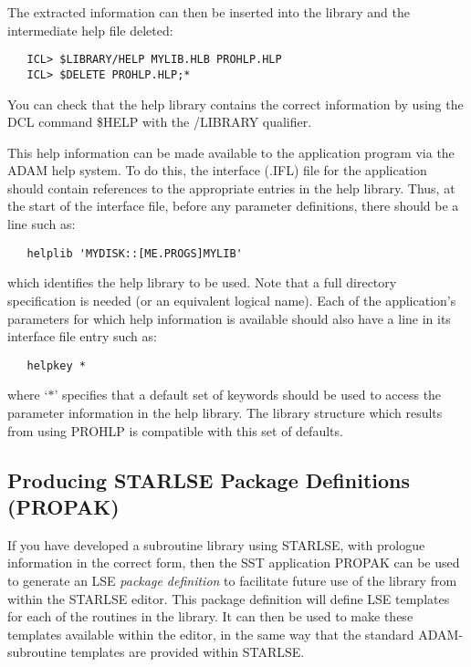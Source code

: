 The extracted information can then be inserted into the library and the
intermediate help file deleted:

\begin{verbatim}
   ICL> $LIBRARY/HELP MYLIB.HLB PROHLP.HLP
   ICL> $DELETE PROHLP.HLP;*
\end{verbatim}

You can check that the help library contains the correct information by using
the DCL command \$HELP with the /LIBRARY qualifier.

This help information can be made available to the application program via
the ADAM help system.
To do this, the interface (.IFL) file for the application should contain
references to the appropriate entries in the help library.
Thus, at the start of the interface file, before any parameter definitions,
there should be a line such as:

\begin{verbatim}
   helplib 'MYDISK::[ME.PROGS]MYLIB'
\end{verbatim}

which identifies the help library to be used.
Note that a full directory specification is needed (or an equivalent logical
name).
Each of the application's parameters for which help information is available
should also have a line in its interface file entry such as:

\begin{verbatim}
   helpkey *
\end{verbatim}

where `$*$' specifies that a default set of keywords should be used to
access the parameter information in the help library.
The library structure which results from using PROHLP is compatible with
this set of defaults.


\subsection{Producing STARLSE Package Definitions (PROPAK)}
\label{sect:propak}

If you have developed a subroutine library using STARLSE, with prologue
information in the correct form, then the SST application PROPAK can be used
to generate an LSE {\em package definition} to facilitate future use of the
library from within the STARLSE editor.
This package definition will define LSE templates for each of the routines
in the library.
It can then be used to make these templates available within the editor, in
the same way that the standard ADAM-subroutine templates are provided within
STARLSE.

